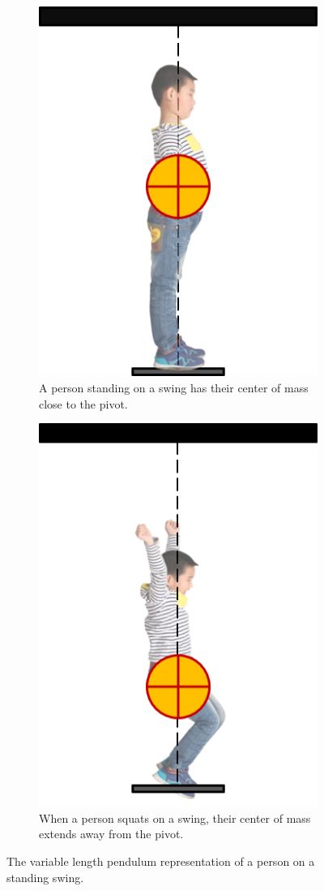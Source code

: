 \begin{figure}
   \centering
   \begin{subfigure}[t]{0.45\textwidth}
      \includegraphics[]{images/child_vlp_standing.png}
      \caption{A person standing on a swing has their center of mass 
      close to the pivot.}
   \end{subfigure}
   \hfill
   \begin{subfigure}[t]{0.45\textwidth}
      \includegraphics[]{images/child_vlp_squatting.png}
      \caption{When a person squats on a swing, their center of mass extends
      away from the pivot.}
   \end{subfigure}
   \caption{The variable length pendulum representation of a person on a
   standing swing.}\label{fig:child-vlp}
\end{figure}

